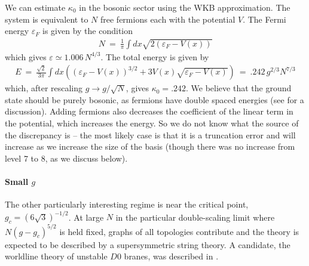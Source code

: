 \documentclass[a4paper,11pt]{article}
\numberwithin{equation}{section}
\begin{document}
We can estimate $\kappa_0$ in the bosonic sector using the WKB approximation. The system is equivalent to $N$ free fermions each with the potential $V$. The Fermi energy $\varepsilon_F$ is given by the condition
%
\begin{align}
    N \ = \ \frac{1}{\pi} \int dx \sqrt{2(\varepsilon_F - V(x))} 
\end{align}
%
which gives $\varepsilon \simeq 1.006 \, N^{4/3}$. The total energy is given by 
%
\begin{align}
    E \ = \ \frac{ \sqrt{2}}{3\pi} \int dx \left((\varepsilon_F - V(x))^{3/2}+ 3 V(x) \sqrt{\varepsilon_F - V(x)}  \right) \ = \  .242 \,  g^{2/3} N^{7/3}
\end{align}
%
which, after rescaling $g \to g / \sqrt{N}$, gives $\kappa_0 = .242$. We believe that the ground state should be purely bosonic, as fermions have double spaced energies (see \cite{McGreevy:2003dn} for a discussion). Adding fermions also decreases the coefficient of the linear term in the potential, which increases the energy. So we do not know what the source of the discrepancy is -- the most likely case is that it is a truncation error and will increase as we increase the size of the basis (though there was no increase from level 7 to 8, as we discuss below).

\paragraph{Small $g$}

The other particularly interesting regime is near the critical point, $g_c = (6 \sqrt{3})^{-1/2}$. At large $N$ in the particular double-scaling limit where $N (g - g_c)^{5/2}$ is held fixed, graphs of all topologies contribute and the theory is expected to be described by a supersymmetric string theory. A candidate, the worldline theory of unstable $D0$ branes, was described in \cite{McGreevy:2003dn}. 
\end{document}
